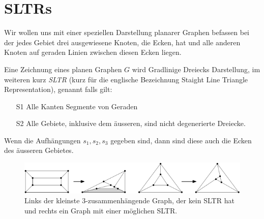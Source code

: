 \section{SLTRs}

Wir wollen uns mit einer speziellen Darstellung planarer Graphen befassen bei der jedes Gebiet drei ausgewiesene Knoten, die Ecken, hat und alle anderen Knoten auf geraden Linien zwischen diesen Ecken liegen.

\begin{definition}[SLTR]\label{defsltr}
Eine Zeichnung eines planen Graphen $G$ wird Gradlinige Dreiecks Darstellung, im weiteren kurz \textit{SLTR} (kurz für die englische Bezeichnung Staight Line Triangle Representation), genannt falls gilt:
\begin{itemize}
\item[S1] Alle Kanten Segmente von Geraden
\item[S2] Alle Gebiete, inklusive dem äusseren, sind nicht degenerierte Dreiecke.
\end{itemize}
Wenn die Aufhängungen $s_1,s_2,s_3$ gegeben sind, dann sind diese auch die Ecken des äusseren Gebietes.
\end{definition}

\begin{figure}
	\centering
  \includegraphics[scale=0.65]{sltr-example.png}
	\caption{Links der kleinste 3-zusammenhängende Graph, der kein SLTR hat und rechts ein Graph mit einer möglichen SLTR.}
	\label{cut_figure}
\end{figure}